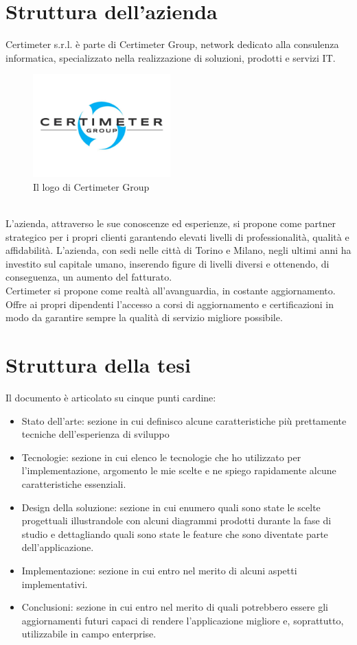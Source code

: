 \section{Struttura dell'azienda}
Certimeter s.r.l. è parte di Certimeter Group, network dedicato alla consulenza informatica, specializzato nella realizzazione di soluzioni, prodotti e servizi IT.
\begin{figure}[h]
    \centering
    \includegraphics[width=200px]{./images/certimeter_logo.jpeg}
    \caption{Il logo di Certimeter Group}
    \label{fig:CertLogo}
\end{figure}
\\
L'azienda, attraverso le sue conoscenze ed esperienze, si propone come partner strategico per i propri clienti garantendo elevati livelli di professionalità, qualità e affidabilità.
L'azienda, con sedi nelle città di Torino e Milano, negli ultimi anni ha investito sul capitale umano, inserendo figure di livelli diversi e ottenendo, di conseguenza, un aumento del fatturato.
\\
Certimeter si propone come realtà all'avanguardia, in costante aggiornamento. Offre ai propri dipendenti l'accesso a corsi di aggiornamento e certificazioni in modo da garantire sempre la qualità di servizio migliore possibile.

\section{Struttura della tesi}
Il documento è articolato su cinque punti cardine:
\begin{itemize}
    \item Stato dell'arte: sezione in cui definisco alcune caratteristiche più prettamente tecniche dell'esperienza di sviluppo
    \item Tecnologie: sezione in cui elenco le tecnologie che ho utilizzato per l'implementazione, argomento le mie scelte e ne spiego rapidamente alcune caratteristiche essenziali.
    \item Design della soluzione: sezione in cui enumero quali sono state le scelte progettuali illustrandole con alcuni diagrammi prodotti durante la fase di studio e dettagliando quali sono state le feature che sono diventate parte dell'applicazione.
    \item Implementazione: sezione in cui entro nel merito di alcuni aspetti implementativi.
    \item Conclusioni: sezione in cui entro nel merito di quali potrebbero essere gli aggiornamenti futuri capaci di rendere l'applicazione migliore e, soprattutto, utilizzabile in campo enterprise.
\end{itemize}